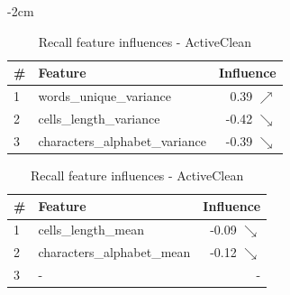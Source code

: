 \begin{table}[H]
	\centering
	\addtolength{\leftskip} {-2cm}
	\addtolength{\rightskip}{-2cm}
	\captionsetup[subtable]{position = below}
	\captionsetup[table]{position=top}
	\caption{Top feature influences - ActiveClean}
	\label{tab:feature_influences_ActiveClean}
		\begin{subtable}{0.5\linewidth}
		\centering
		\begin{tabular}{llr}
\toprule
 \# &                         Feature &         Influence \\
\midrule
 1 &         words\_unique\_variance &   0.39 $\nearrow$ \\
 2 &         cells\_length\_variance &  -0.42 $\searrow$ \\
 3 &  characters\_alphabet\_variance &  -0.39 $\searrow$ \\
\bottomrule
\end{tabular}
		\caption{Precision feature influences - ActiveClean}
		\label{tab:prec_feature_influences_ActiveClean}
	\end{subtable}
	\hspace*{4em}
	\begin{subtable}{0.5\linewidth}
		\centering
		\begin{tabular}{llr}
\toprule
 \# &                     Feature &         Influence \\
\midrule
 1 &         cells\_length\_mean &  -0.09 $\searrow$ \\
 2 &  characters\_alphabet\_mean &  -0.12 $\searrow$ \\
 3 &       - &                 - \\
\bottomrule
\end{tabular}
		\caption{Recall feature influences - ActiveClean}
		\label{tab:rec_feature_influences_ActiveClean}
	\end{subtable}%
\end{table}

